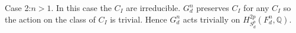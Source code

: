 \documentclass[12pt,reqno]{article}
\newcommand {\ZZ}{{\mathds Z}}
\newcommand {\C}{{\mathds C}}
\newcommand {\Q}{{\mathds Q}}
\newcommand {\OO}{{\mathcal O}}
\def\Ind{\operatorname{Ind}}
\begin{document}
\noindent Case 2:$n >1$. In this case the $C_I$ are irreducible. $G_d^n$ preserves $C_I$ for any $C_I$ so the action on the class of $C_I$ is trivial. Hence $G_d^n$ acts trivially on $H^{2p}_{S_d^p}(F_d^n,\Q)$.

\end{document}
